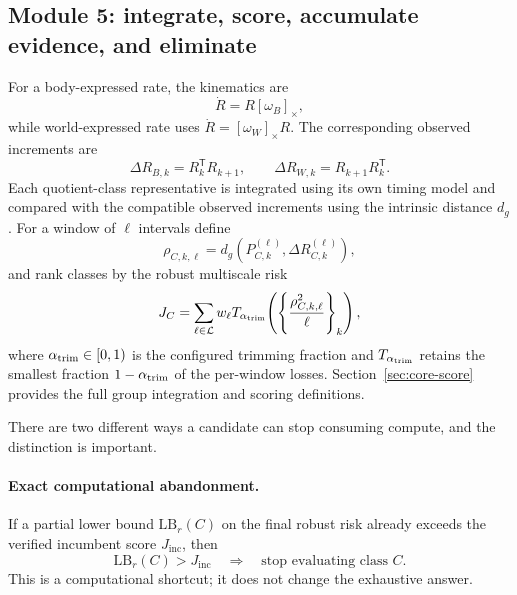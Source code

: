 \documentclass[11pt]{article}
\begin{document}
    \subsection{Module 5: integrate, score, accumulate evidence, and eliminate}

    For a body-expressed rate, the kinematics are
    \begin{equation}
        \dot R=R[\omega_B]_\times,
    \end{equation}
    while world-expressed rate uses $\dot R=[\omega_W]_\times R$. The corresponding
    observed increments are
    \begin{equation}
        \Delta R_{B,k}=R_k^{\mathsf T}R_{k+1},
        \qquad
        \Delta R_{W,k}=R_{k+1}R_k^{\mathsf T}.
        \label{eq:focused-increments}
    \end{equation}
    Each quotient-class representative is integrated using its own timing model and compared
    with the compatible observed increments using the intrinsic distance $d_g$.
    For a window of $\ell$ intervals define
    \begin{equation}
        \rho_{C,k,\ell}
        =d_g(P_{C,k}^{(\ell)},\Delta R_{C,k}^{(\ell)}),
    \end{equation}
    and rank classes by the robust multiscale risk
    \begin{equation}
        J_C
        =\sum_{\ell\in\mathcal L}w_\ell
        T_{\alpha_{\rm trim}}\!\left(
                                   \left\{\frac{\rho_{C,k,\ell}^2}{\ell}\right\}_k
        \right),
        \label{eq:focused-risk}
    \end{equation}
    where $\alpha_{\rm trim}\in[0,1)$ is the configured trimming fraction and $T_{\alpha_{\rm trim}}$ retains the smallest fraction $1-\alpha_{\rm trim}$ of the per-window losses. Section~\ref{sec:core-score}
    provides the full group integration and scoring definitions.

    There are two different ways a candidate can stop consuming compute, and the distinction
    is important.

    \paragraph{Exact computational abandonment.}
    If a partial lower bound $\mathrm{LB}_r(C)$ on the final robust risk already exceeds the
    verified incumbent score $J_{\mathrm{inc}}$, then
    \begin{equation}
        \mathrm{LB}_r(C)>J_{\mathrm{inc}}
        \quad\Longrightarrow\quad
        \text{stop evaluating class }C.
        \label{eq:focused-exact-abandon}
    \end{equation}
    This is a computational shortcut; it does not change the exhaustive answer.
\end{document}
